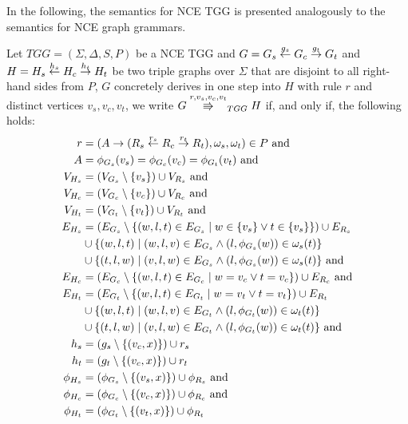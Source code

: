 \documentclass[runningheads]{llncs}
\begin{document}
In the following, the semantics for NCE TGG is presented analogously to the semantics for NCE graph grammars.

\begin{definition}
	\label{def:tgg_dstep}
	Let $TGG = (\Sigma, \Delta, S, P)$ be a NCE TGG and $G = G_s \overset{g_s}{\leftarrow} G_c \overset{g_t}{\rightarrow} G_t$ and $H = H_s \overset{h_s}{\leftarrow} H_c \overset{h_t}{\rightarrow} H_t$ be two triple graphs over $\Sigma$ that are disjoint to all right-hand sides from $P$, $G$ concretely derives in one step into $H$ with rule $r$ and distinct vertices $v_s, v_c, v_t$, we write $G \tcderiv{r}{v_s,v_c,v_t}{TGG} H$ if, and only if, the following holds:
	\begin{align*}
		r & = (A \to (R_s \overset{r_s}{\leftarrow} R_c \overset{r_t}{\rightarrow} R_t), \omega_s, \omega_t) \in P \text{ and } \\
		A & = \phi_{G_s}(v_s) = \phi_{G_c}(v_c) = \phi_{G_t}(v_t) \text{ and}\\
		V_{H_s}  & = (V_{G_s} \setminus \{v_s\}) \cup V_{R_s} \text{ and}\\
		V_{H_c}  & = (V_{G_c} \setminus \{v_c\}) \cup V_{R_c} \text{ and}\\
		V_{H_t}  & = (V_{G_t} \setminus \{v_t\}) \cup V_{R_t} \text{ and}\\
		E_{H_s} & = (E_{G_s} \setminus \{(w,l,t) \in E_{G_s} \; | \; w \in \{v_s\} \lor t \in \{v_s\} \}) \cup E_{R_s} \\
		& \cup \{(w,l,t) \; | \; (w,l,v) \in E_{G_s} \land (l,\phi_{G_s}(w)) \in \omega_{s}(t)\} \\
		& \cup \{(t,l,w) \; | \; (v,l,w) \in E_{G_s} \land (l,\phi_{G_s}(w)) \in \omega_{s}(t)\} \text{ and} \\
		E_{H_c} & = (E_{G_c} \setminus \{(w,l,t) \in E_{G_c} \; | \; w = v_c \lor t = v_c \}) \cup E_{R_c} \text{ and} \\
		E_{H_t} & = (E_{G_t} \setminus \{(w,l,t) \in E_{G_t} \; | \; w = v_t \lor t = v_t \}) \cup E_{R_t} \\
		& \cup \{(w,l,t) \; | \; (w,l,v) \in E_{G_t} \land (l,\phi_{G_t}(w)) \in \omega_{t}(t)\} \\
		& \cup \{(t,l,w) \; | \; (v,l,w) \in E_{G_t} \land (l,\phi_{G_t}(w)) \in \omega_{t}(t)\} \text{ and} \\
		h_s		& = (g_s \setminus \{(v_c,x)\}) \cup r_s  \\
		h_t		& = (g_t \setminus \{(v_c,x)\}) \cup r_t  \\
		\phi_{H_s} & = (\phi_{G_s} \setminus \{(v_s,x)\}) \cup \phi_{R_s} \text{ and}\\
		\phi_{H_c} & = (\phi_{G_c} \setminus \{(v_c,x)\}) \cup \phi_{R_c} \text{ and}\\
		\phi_{H_t} & = (\phi_{G_t} \setminus \{(v_t,x)\}) \cup \phi_{R_t}\\
	\end{align*}
\end{definition}
\end{document}
